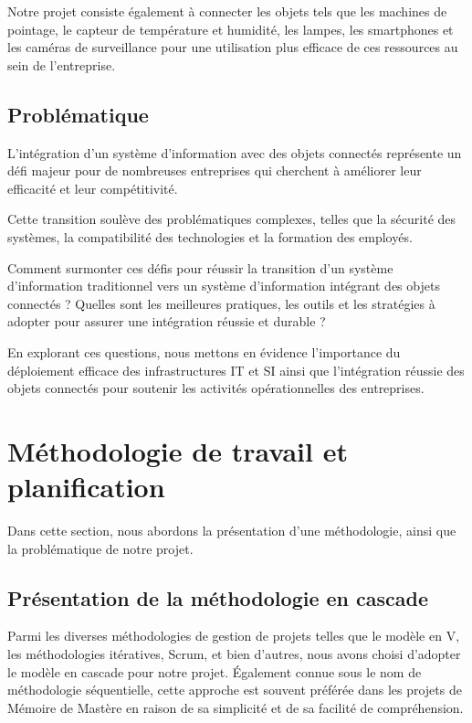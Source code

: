 Notre projet consiste également à connecter les objets tels que les machines de pointage, le capteur de température et humidité, les lampes, les smartphones et les caméras de surveillance pour une utilisation plus efficace de ces ressources au sein de l'entreprise.

\subsection{Problématique}
L'intégration d'un système d'information avec des objets connectés représente un défi majeur pour de nombreuses entreprises qui cherchent à améliorer leur efficacité et leur compétitivité.

Cette transition soulève des problématiques complexes, telles que la sécurité des systèmes, la compatibilité des technologies et la formation des employés.

Comment surmonter ces défis pour réussir la transition d'un système d'information traditionnel vers un système d'information intégrant des objets connectés ? Quelles sont les meilleures pratiques, les outils et les stratégies à adopter pour assurer une intégration réussie et durable ?

En explorant ces questions, nous mettons en évidence l'importance du déploiement efficace des infrastructures IT et SI ainsi que l'intégration réussie des objets connectés pour soutenir les activités opérationnelles des entreprises.



\section{Méthodologie de travail et planification}

Dans cette section, nous abordons la présentation d'une méthodologie, ainsi que la problématique de notre projet.


\subsection{Présentation de la méthodologie en cascade}

Parmi les diverses méthodologies de gestion de projets telles que le modèle en V, les méthodologies itératives, Scrum, et bien d'autres, nous avons choisi d'adopter le modèle en cascade pour notre projet. Également connue sous le nom de méthodologie séquentielle, cette approche est souvent préférée dans les projets de Mémoire de Mastère en raison de sa simplicité et de sa facilité de compréhension.

